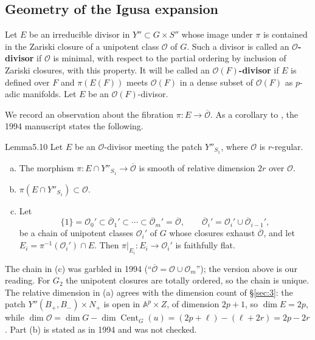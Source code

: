 \documentclass[12pt,letterpaper]{amsart}
\theoremstyle{plain}
\theoremstyle{definition}
\theoremstyle{remark}
\theoremstyle{definition}
\newcommand{\ooo}{\mathcal{O}}
\newcommand{\aaa}{\mathbb{A}}
\DeclareMathOperator{\Cent}{Cent}
\begin{document}
\subsection*{Geometry of the Igusa expansion}

Let $E$ be an irreducible divisor in $Y''\subset G\times S''$
whose image under $\pi$ is contained in the
Zariski closure of a unipotent class ${\mathcal O}$ of $G$. Such a divisor is
called an \textbf{${\mathcal O}$-divisor} if ${\mathcal O}$ is minimal, with
respect to the partial ordering by inclusion of Zariski closures, with this
property. It will be called an \textbf{${\mathcal O}(F)$-divisor} if $E$
is defined over $F$ and
$\pi(E(F))$ meets ${\mathcal O}(F)$ in a dense subset of $\ooo(F)$
as $p$-adic manifolds.
Let $E$ be an ${\mathcal O}(F)$-divisor.

We record an observation about
the fibration $\pi:E\rightarrow \overline{\ooo}$.
As a corollary to \cite[Ch.~II, Prop.~3.1]{DG80}, the 1994 manuscript states
the following.

\begin{res}{Lemma}{5.10}\label{res:5.10}
Let $E$ be an $\mathcal O$-divisor meeting the patch $Y''_{S_1}$, where
$\mathcal O$ is $r$-regular.
\begin{enumerate}[(a)]
\item The morphism $\pi:E\cap Y''_{S_1} \rightarrow \overline{\ooo}$ is
smooth of relative dimension $2r$ over $\mathcal O$.
\item $\pi(E\cap Y''_{S_1})\subset \ooo$.
\item Let
\[
\{1\}={\mathcal O}_0'\subset\overline{\mathcal O}_1'
\subset \cdots\subset \overline{\mathcal O}_m'=\overline{\mathcal O},
\qquad
\overline{\mathcal O}_i'={\mathcal O}_i'\cup\overline{\mathcal O}_{i-1}',
\]
be a chain of unipotent classes ${\mathcal O}_i'$ of $G$ whose closures
exhaust $\overline{\mathcal O}$, and let
$E_i=\pi^{-1}({\mathcal O}_i')\cap E$. Then $\pi|_{E_i}:E_i
\rightarrow {\mathcal O}_i'$ is faithfully flat.
\end{enumerate}
\end{res}

\begin{rem26}\label{rem:5.10}
The chain in (c) was garbled in 1994 (``$\overline{\mathcal O}={\mathcal
O}\cup{\mathcal O}_m$''); the version above is our reading. For $G_2$ the
unipotent closures are totally ordered, so the chain is unique. The
relative dimension in (a) agrees with the dimension count of \S\ref{sec:3}:
the patch $Y''(B_+,B_-)\times N_+$ is open in $\aaa^p\times Z$, of dimension
$2p+1$, so $\dim E=2p$, while $\dim\mathcal O=\dim G-\dim\Cent_G(u)
=(2p+\ell)-(\ell+2r)=2p-2r$. Part (b) is stated as in 1994 and was not checked.
\end{rem26}
\end{document}
